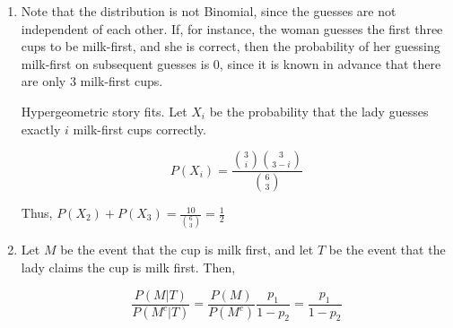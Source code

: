 \begin{enumerate}[label=(\alph*)]
\item Note that the distribution is not Binomial, since the guesses are not
independent of each other. If, for instance, the woman guesses the first three
cups to be milk-first, and she is correct, then the probability of her guessing
milk-first on subsequent guesses is $0$, since it is known in advance that there
are only $3$ milk-first cups.

Hypergeometric story fits. Let $X_{i}$ be the probability that the lady guesses
exactly $i$ milk-first cups correctly.

$$P(X_{i}) = \frac{\binom{3}{i}\binom{3}{3-i}}{\binom{6}{3}}$$

Thus, $P(X_{2}) + P(X_{3}) = \frac{10}{\binom{6}{3}} = \frac{1}{2}$

\item Let $M$ be the event that the cup is milk first, and let $T$ be the event
that the lady claims the cup is milk first. Then,

$$\frac{P(M|T)}{P(M^{c}|T)} = \frac{P(M)}{P(M^{c})}\frac{p_{1}}{1-p_{2}} = \frac{p_{1}}{1-p_{2}}$$
\end{enumerate}